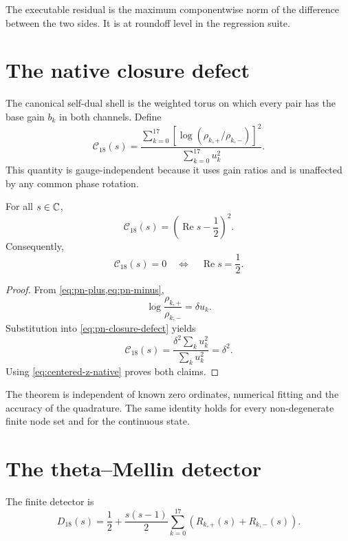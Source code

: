 The executable residual is the maximum componentwise norm of the difference
between the two sides.  It is at roundoff level in the regression suite.

\section{The native closure defect}

The canonical self-dual shell is the weighted torus on which every pair has the
base gain $b_k$ in both channels.  Define
\begin{equation}
 \mathcal C_{18}(s)=
 \frac{\sum_{k=0}^{17}
 \left[\log\left(\rho_{k,+}/\rho_{k,-}\right)\right]^2}
 {\sum_{k=0}^{17}u_k^2}.
 \label{eq:pn-closure-defect}
\end{equation}
This quantity is gauge-independent because it uses gain ratios and is unaffected
by any common phase rotation.

\begin{theorem}
\label{thm:pn-closure}
For all $s\in\mathbb{C}$,
\begin{equation}
 \boxed{\mathcal C_{18}(s)=
 \left(\operatorname{Re}s-\frac12\right)^2.}
 \label{eq:pn-closure-identity}
\end{equation}
Consequently,
\begin{equation}
 \mathcal C_{18}(s)=0
 \quad\Longleftrightarrow\quad
 \operatorname{Re}s=\frac12.
 \label{eq:pn-half-equivalence}
\end{equation}
\end{theorem}

\begin{proof}
From \cref{eq:pn-plus,eq:pn-minus},
\[
 \log\frac{\rho_{k,+}}{\rho_{k,-}}=\delta u_k.
\]
Substitution into \cref{eq:pn-closure-defect} yields
\[
 \mathcal C_{18}(s)=
 \frac{\delta^2\sum_ku_k^2}{\sum_ku_k^2}=\delta^2.
\]
Using \cref{eq:centered-z-native} proves both claims.
\end{proof}

The theorem is independent of known zero ordinates, numerical fitting and the
accuracy of the quadrature.  The same identity holds for every non-degenerate
finite node set and for the continuous state.

\section{The theta--Mellin detector}

The finite detector is
\begin{equation}
 D_{18}(s)=\frac12+\frac{s(s-1)}2
 \sum_{k=0}^{17}\left(R_{k,+}(s)+R_{k,-}(s)\right).
 \label{eq:pn-detector18}
\end{equation}

